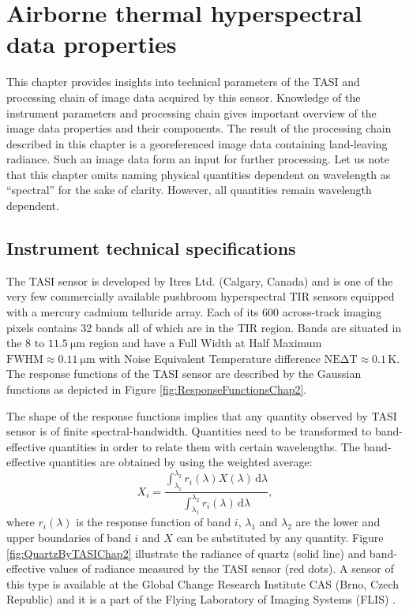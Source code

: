 \chapter{Airborne thermal hyperspectral data properties}
\label{chap:Data}

This chapter provides insights into technical parameters of the TASI and processing chain of image data acquired by this sensor. Knowledge of the instrument parameters and processing chain gives important overview of the image data properties and their components. The result of the processing chain described in this chapter is a georeferenced image data containing land-leaving radiance. Such an image data form an input for further processing. Let us note that this chapter omits naming physical quantities dependent on wavelength as ``spectral'' for the sake of clarity. However, all quantities remain wavelength dependent.

\section{Instrument technical specifications}

The TASI sensor is developed by Itres Ltd. (Calgary, Canada) and is one of the very few commercially available pushbroom hyperspectral TIR sensors equipped with a mercury cadmium telluride array. Each of its 600 across-track imaging pixels contains 32 bands all of which are in the TIR region. Bands are situated in the 8 to $\SI{11.5}{\micro\meter}$ region and have a Full Width at Half Maximum $\mathrm{FWHM} \approx \SI{0.11}{\micro\meter}$ with Noise Equivalent Temperature difference $\mathrm{NE\Delta T} \approx 0.1\,\mathrm{K}$. The response functions of the TASI sensor are described by the Gaussian functions as depicted in Figure \ref{fig:ResponseFunctionsChap2}. 

The shape of the response functions implies that any quantity observed by TASI sensor is of finite spectral-bandwidth. Quantities need to be transformed to band-effective quantities in order to relate them with certain wavelengths. The band-effective quantities are obtained by using the weighted average:
\begin{equation}
	X_i = \frac{\int_{\lambda_1}^{\lambda_2} r_i(\lambda) X(\lambda) \,\mathrm{d}\lambda}{\int_{\lambda_1}^{\lambda_2} r_i(\lambda)\,\mathrm{d}\lambda},
	\label{eq:weightedAverage}
\end{equation}
where $r_i(\lambda)$ is the response function of band $i$, $\lambda_1$ and $\lambda_2$ are the lower and upper boundaries of band $i$ and $X$ can be substituted by any quantity. Figure \ref{fig:QuartzByTASIChap2} illustrate the radiance of quartz (solid line) and band-effective values of radiance measured by the TASI sensor (red dots). A sensor of this type is available at the Global Change Research Institute CAS (Brno, Czech Republic) and it is a part of the Flying Laboratory of Imaging Systems (FLIS) \cite{HF14}.


